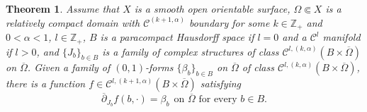 \documentclass[10pt,a4paper]{amsart}
\newtheorem{theorem}{Theorem}
\newcommand\Cscr{\mathscr{C}}
\newcommand\Z{\mathbb{Z}}
\newcommand\dibar{\overline\partial}
\begin{document}
\begin{theorem}\label{th:dibar}
Assume that $X$ is a smooth open orientable surface, 
$\Omega\Subset X$ is a relatively compact domain with 
$\Cscr^{(k+1,\alpha)}$ boundary for some $k\in\Z_+$ and
$0<\alpha<1$, $l\in \Z_+$, $B$ is a paracompact Hausdorff
space if $l=0$ and a $\Cscr^l$ manifold if $l>0$,
and $\{J_b\}_{b\in B}$ is a family of complex structures 
of class $\Cscr^{l,(k,\alpha)}(B\times \overline\Omega)$ 
on $\overline\Omega$.
Given a family of $(0,1)$-forms $\{\beta_b\}_{b\in B}$ 
on $\overline\Omega$ of class 
$\Cscr^{l,(k,\alpha)}(B\times \overline\Omega)$, 
there is a function 
$f\in \Cscr^{l,(k+1,\alpha)}(B\times\overline\Omega)$ satisfying
\begin{equation}\label{eq:dibar}
	\dibar_{J_b} f(b,\cdotp) = \beta_b \ \ 
	\text{on $\overline \Omega$ for every $b\in B$.}
\end{equation}
\end{theorem}
\end{document}

